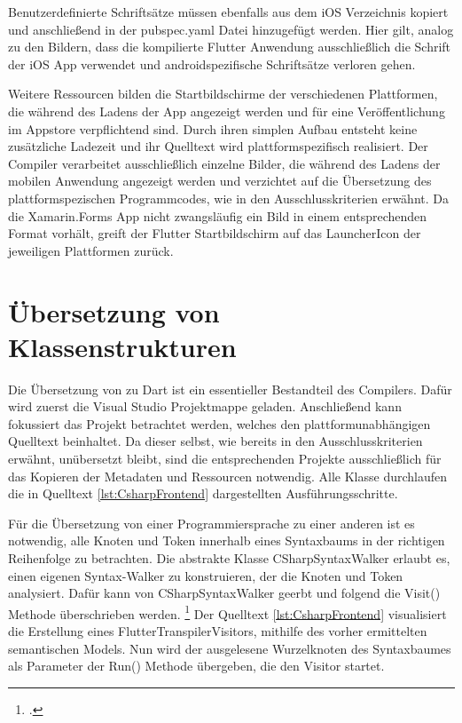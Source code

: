  


Benutzerdefinierte Schriftsätze müssen ebenfalls aus dem iOS Verzeichnis kopiert und anschließend in der pubspec.yaml Datei hinzugefügt werden.  Hier gilt,  analog zu den Bildern,  dass die kompilierte Flutter Anwendung ausschließlich die Schrift der iOS App verwendet und androidspezifische Schriftsätze verloren gehen.

Weitere Ressourcen bilden die Startbildschirme der verschiedenen Plattformen,  die während des Ladens der App angezeigt werden und für eine Veröffentlichung im Appstore verpflichtend sind.  Durch ihren simplen Aufbau entsteht keine zusätzliche Ladezeit und ihr Quelltext wird plattformspezifisch realisiert.  Der Compiler verarbeitet ausschließlich einzelne Bilder, die während des Ladens der mobilen Anwendung angezeigt werden und verzichtet auf die Übersetzung des plattformspezischen Programmcodes,  wie in den Ausschlusskriterien erwähnt.  Da die Xamarin.Forms App nicht zwangsläufig ein Bild in einem entsprechenden Format vorhält,  greift der Flutter Startbildschirm auf das LauncherIcon der jeweiligen Plattformen zurück.  

\section{Übersetzung von Klassenstrukturen}

Die Übersetzung von \Csharp{} zu Dart ist ein essentieller Bestandteil des Compilers.  Dafür wird zuerst die Visual Studio Projektmappe geladen.  Anschließend kann fokussiert das Projekt betrachtet werden, welches den plattformunabhängigen Quelltext beinhaltet.  Da dieser selbst, wie bereits in den Ausschlusskriterien erwähnt,  unübersetzt bleibt, sind die entsprechenden Projekte ausschließlich für das Kopieren der Metadaten und Ressourcen notwendig.  Alle Klasse durchlaufen die in Quelltext \ref{lst:CsharpFrontend} dargestellten Ausführungsschritte. 

Für die Übersetzung von einer Programmiersprache zu einer anderen ist es notwendig,  alle Knoten und Token innerhalb eines Syntaxbaums in der richtigen Reihenfolge zu betrachten.  Die abstrakte Klasse \glq CSharpSyntaxWalker\grq{} erlaubt es,  einen eigenen \glq Syntax-Walker\grq{} zu konstruieren,  der die Knoten und Token analysiert.  Dafür kann von \glq CSharpSyntaxWalker\grq{} geerbt und folgend die \glq Visit()\grq{} Methode überschrieben werden.  \footcite[Vgl.][Abgerufen am \today]{Varty2014}  Der Quelltext \ref{lst:CsharpFrontend} visualisiert die Erstellung eines \glq FlutterTranspilerVisitors\grq ,  mithilfe des vorher ermittelten semantischen Models.  Nun wird der ausgelesene Wurzelknoten des Syntaxbaumes als Parameter der \glq Run()\grq{} Methode übergeben,  die den \glq Visitor\grq{} startet.  

